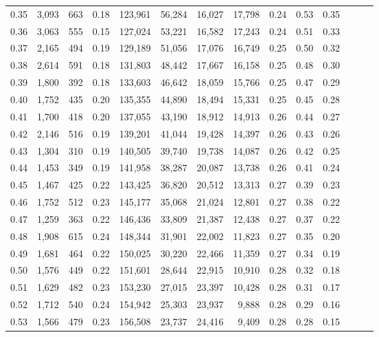 \begin{tabular}{rrrrrrrrrrrrrr}
0.35 &  3,093 &  663 &  0.18 &  123,961 &   56,284 &  16,027 &  17,798 &  0.24 &  0.53 &      0.35 \\
0.36 &  3,063 &  555 &  0.15 &  127,024 &   53,221 &  16,582 &  17,243 &  0.24 &  0.51 &      0.33 \\
0.37 &  2,165 &  494 &  0.19 &  129,189 &   51,056 &  17,076 &  16,749 &  0.25 &  0.50 &      0.32 \\
0.38 &  2,614 &  591 &  0.18 &  131,803 &   48,442 &  17,667 &  16,158 &  0.25 &  0.48 &      0.30 \\
0.39 &  1,800 &  392 &  0.18 &  133,603 &   46,642 &  18,059 &  15,766 &  0.25 &  0.47 &      0.29 \\
0.40 &  1,752 &  435 &  0.20 &  135,355 &   44,890 &  18,494 &  15,331 &  0.25 &  0.45 &      0.28 \\
0.41 &  1,700 &  418 &  0.20 &  137,055 &   43,190 &  18,912 &  14,913 &  0.26 &  0.44 &      0.27 \\
0.42 &  2,146 &  516 &  0.19 &  139,201 &   41,044 &  19,428 &  14,397 &  0.26 &  0.43 &      0.26 \\
0.43 &  1,304 &  310 &  0.19 &  140,505 &   39,740 &  19,738 &  14,087 &  0.26 &  0.42 &      0.25 \\
0.44 &  1,453 &  349 &  0.19 &  141,958 &   38,287 &  20,087 &  13,738 &  0.26 &  0.41 &      0.24 \\
0.45 &  1,467 &  425 &  0.22 &  143,425 &   36,820 &  20,512 &  13,313 &  0.27 &  0.39 &      0.23 \\
0.46 &  1,752 &  512 &  0.23 &  145,177 &   35,068 &  21,024 &  12,801 &  0.27 &  0.38 &      0.22 \\
0.47 &  1,259 &  363 &  0.22 &  146,436 &   33,809 &  21,387 &  12,438 &  0.27 &  0.37 &      0.22 \\
0.48 &  1,908 &  615 &  0.24 &  148,344 &   31,901 &  22,002 &  11,823 &  0.27 &  0.35 &      0.20 \\
0.49 &  1,681 &  464 &  0.22 &  150,025 &   30,220 &  22,466 &  11,359 &  0.27 &  0.34 &      0.19 \\
0.50 &  1,576 &  449 &  0.22 &  151,601 &   28,644 &  22,915 &  10,910 &  0.28 &  0.32 &      0.18 \\
0.51 &  1,629 &  482 &  0.23 &  153,230 &   27,015 &  23,397 &  10,428 &  0.28 &  0.31 &      0.17 \\
0.52 &  1,712 &  540 &  0.24 &  154,942 &   25,303 &  23,937 &   9,888 &  0.28 &  0.29 &      0.16 \\
0.53 &  1,566 &  479 &  0.23 &  156,508 &   23,737 &  24,416 &   9,409 &  0.28 &  0.28 &      0.15 \\

\end{tabular}
